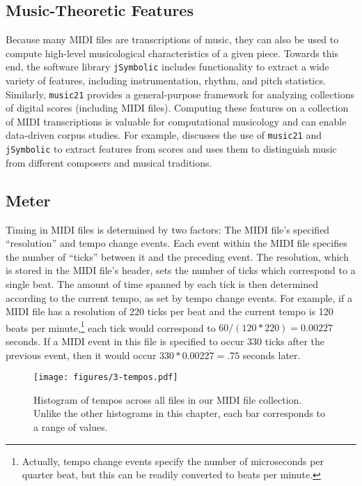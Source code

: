 \subsection{Music-Theoretic Features}

Because many MIDI files are transcriptions of music, they can also be used to compute high-level musicological characteristics of a given piece.
Towards this end, the software library \texttt{jSymbolic} \cite{mckay2006jsymbolic} includes functionality to extract a wide variety of features, including instrumentation, rhythm, and pitch statistics.
Similarly, \texttt{music21} \cite{cuthbert2010music21} provides a general-purpose framework for analyzing collections of digital scores (including MIDI files).
Computing these features on a collection of MIDI transcriptions is valuable for computational musicology and can enable data-driven corpus studies.
For example, \cite{cuthbert2011feature} discusses the use of \texttt{music21} and \texttt{jSymbolic} to extract features from scores and uses them to distinguish music from different composers and musical traditions.

\subsection{Meter}

Timing in MIDI files is determined by two factors: The MIDI file's specified ``resolution'' and tempo change events.
Each event within the MIDI file specifies the number of ``ticks'' between it and the preceding event.
The resolution, which is stored in the MIDI file's header, sets the number of ticks which correspond to a single beat.
The amount of time spanned by each tick is then determined according to the current tempo, as set by tempo change events.
For example, if a MIDI file has a resolution of 220 ticks per beat and the current tempo is 120 beats per minute,\footnote{Actually, tempo change events specify the number of microseconds per quarter beat, but this can be readily converted to beats per minute.} each tick would correspond to $60/(120*220) = 0.002\overline{27}$ seconds.
If a MIDI event in this file is specified to occur 330 ticks after the previous event, then it would occur $330*0.002\overline{27} = .75$ seconds later.

\begin{figure}
  \centering
  \texttt{[image: figures/3-tempos.pdf]}
  \caption[Histogram of tempos]{Histogram of tempos across all files in our MIDI file collection.
Unlike the other histograms in this chapter, each bar corresponds to a range of values.}
    \label{fig:3-tempos}
\end{figure}

